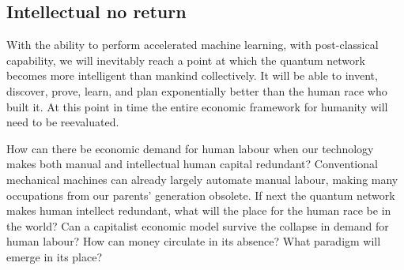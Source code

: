 %
%

\subsection{Intellectual no return}

With the ability to perform accelerated machine learning, with post-classical capability, we will inevitably reach a point at which the quantum network becomes more intelligent than mankind collectively. It will be able to invent, discover, prove, learn, and plan exponentially better than the human race who built it. At this point in time the entire economic framework for humanity will need to be reevaluated.

How can there be economic demand for human labour when our technology makes both manual and intellectual human capital redundant? Conventional mechanical machines can already largely automate manual labour, making many occupations from our parents' generation obsolete. If next the quantum network makes human intellect redundant, what will the place for the human race be in the world? Can a capitalist economic model survive the collapse in demand for human labour? How can money circulate in its absence? What paradigm will emerge in its place?

